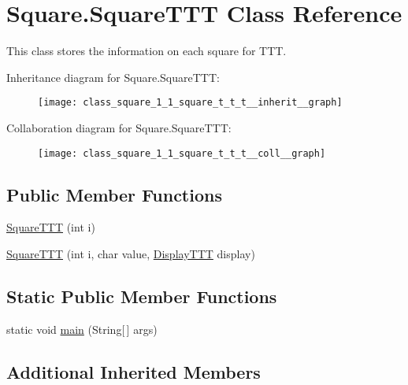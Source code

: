 \hypertarget{class_square_1_1_square_t_t_t}{}\section{Square.\+Square\+T\+T\+T Class Reference}
\label{class_square_1_1_square_t_t_t}


This class stores the information on each square for T\+T\+T.  




Inheritance diagram for Square.\+Square\+T\+T\+T\+:
\nopagebreak
\begin{figure}[H]
\begin{center}
\leavevmode
\texttt{[image: class\_square\_1\_1\_square\_t\_t\_t\_\_inherit\_\_graph]}
\end{center}
\end{figure}


Collaboration diagram for Square.\+Square\+T\+T\+T\+:
\nopagebreak
\begin{figure}[H]
\begin{center}
\leavevmode
\texttt{[image: class\_square\_1\_1\_square\_t\_t\_t\_\_coll\_\_graph]}
\end{center}
\end{figure}
\subsection*{Public Member Functions}
\begin{DoxyCompactItemize}
\item 
\hyperlink{class_square_1_1_square_t_t_t_a61856539b9717c3b5a3c6f46da3bb1a2}{Square\+T\+T\+T} (int i)
\item 
\hyperlink{class_square_1_1_square_t_t_t_aa369a31f4b3520bbbb7db02d31a11139}{Square\+T\+T\+T} (int i, char value, \hyperlink{class_display_1_1_display_t_t_t}{Display\+T\+T\+T} display)
\end{DoxyCompactItemize}
\subsection*{Static Public Member Functions}
\begin{DoxyCompactItemize}
\item 
static void \hyperlink{class_square_1_1_square_t_t_t_ad094b8dd8700576e4323fd69773dd6e9}{main} (String\mbox{[}$\,$\mbox{]} args)
\end{DoxyCompactItemize}
\subsection*{Additional Inherited Members}


